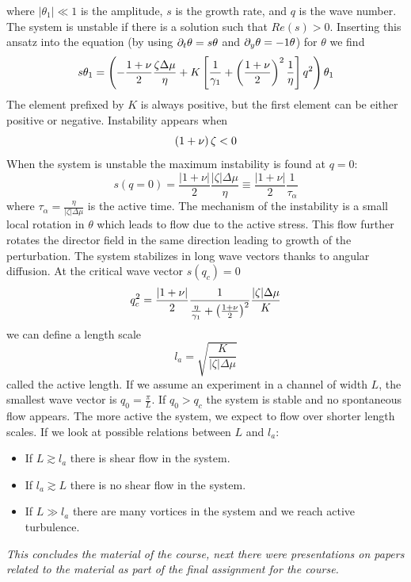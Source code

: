 where \(\lvert\theta_1\rvert \ll 1\) is the amplitude, \(s\) is the growth rate, and \(q\) is the wave number. The system is unstable if there is a solution such that \(Re(s)>0\). Inserting this ansatz into the equation (by using \(\partial_t\theta = s\theta\) and \(\partial_y\theta = -1\theta \)) for \(\theta \) we find
\begin{equation}
    s\theta_1 = \left(-\frac{1+\nu}{2}\frac{\zeta\Delta\mu}{\eta} + K\left[\frac{1}{\gamma_1} + \left(\frac{1+\nu}{2}\right)^2\frac{1}{\eta}\right]q^2\right)\theta_1
\end{equation}
The element prefixed by \(K\) is always positive, but the first element can be either positive or negative. Instability appears when
\begin{equation}
    \left(1+\nu\right)\zeta < 0
\end{equation}
When the system is unstable the maximum instability is found at \(q=0\):
\begin{equation}
    s(q=0) = \frac{\lvert1+\nu\rvert}{2}\frac{\lvert\zeta\rvert\Delta\mu}{\eta} \equiv \frac{\lvert1+\nu\rvert}{2}\frac{1}{\tau_\alpha}
\end{equation}
where \(\tau_\alpha = \frac{\eta}{\lvert\zeta\rvert\Delta\mu}\) is the active time. The mechanism of the instability is a small local rotation in \(\theta \) which leads to flow due to the active stress. This flow further rotates the director field in the same direction leading to growth of the perturbation. The system stabilizes in long wave vectors thanks to angular diffusion. At the critical wave vector \(s(q_c)=0\)
\begin{equation}
    q_c^2 = \frac{\lvert1+\nu\rvert}{2}\frac{1}{\frac{\eta}{\gamma_1} + \left(\frac{1+\nu}{2}\right)^2} \frac{\lvert\zeta\rvert\Delta\mu}{K}
\end{equation}
we can define a length scale
\begin{equation}
    l_a = \sqrt{\frac{K}{\lvert\zeta\rvert\Delta\mu}}
\end{equation}
called the active length. If we assume an experiment in a channel of width \(L\), the smallest wave vector is \(q_0 = \frac{\pi}{L}\). If \(q_0 > q_c\) the system is stable and no spontaneous flow appears. The more active the system, we expect to flow over shorter length scales. If we look at possible relations between \(L\) and \(l_a\):
\begin{itemize}
    \item If \(L \gtrsim l_a\) there is shear flow in the system.
    \item If \(l_a \gtrsim L\) there is no shear flow in the system.
    \item If \(L \gg l_a\) there are many vortices in the system and we reach active turbulence.
\end{itemize}
\emph{This concludes the material of the course, next there were presentations on papers related to the material as part of the final assignment for the course.}